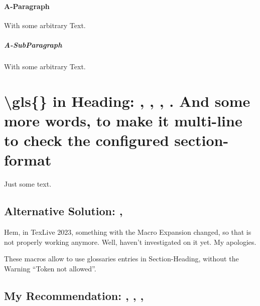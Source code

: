 \paragraph{A-Paragraph}
With some arbitrary Text.

\subparagraph{A-SubParagraph}
With some arbitrary Text.





\section{\textbackslash gls\{\} in Heading:
    \texorpdfstring{}{DLL},
    \texorpdfstring{}{DLL},
    \texorpdfstring{}{DLLs},
    \texorpdfstring{}{DLLs}.
    And some more words, to make it multi-line to check the configured section-format
}

Just some text.



\edef\tokenA{\glsentrytext{dll}}
\edef\tokenB{\glsentrydesc{dll}}
\subsection{Alternative Solution: \texorpdfstring{\tokenA}{DLL}, \texorpdfstring{\tokenB}{DLL}}
Hem, in TexLive 2023, something with the Macro Expansion changed, so that is not properly working anymore. Well, haven't investigated on it yet. My apologies.

These macros allow to use glossaries entries in Section-Heading, without the Warning \enquote{Token not allowed}.


\subsection{My Recommendation: 
, ,
, 
}

